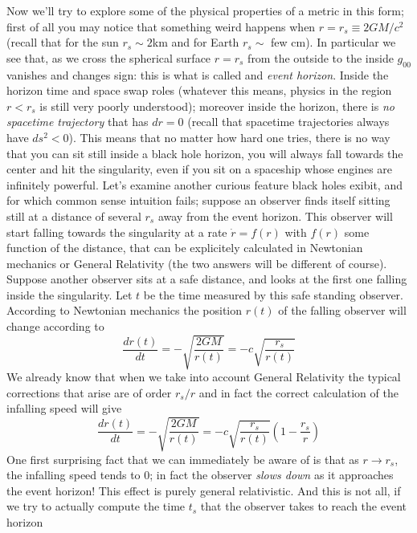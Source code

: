 \documentclass[11pt, a4paper,oneside,openright]{book}
\numberwithin{equation}{section}
\begin{document}
Now we'll try to explore some of the physical properties of a metric in this form; first of all you may notice that something weird happens when $r=r_s\equiv 2GM/c^2$ (recall that for the sun $r_s\sim 2$km and for Earth $r_s\sim$ few cm). In particular we see that, as we cross the spherical surface $r=r_s$ from the outside to the inside $g_{00}$ vanishes and changes sign: this is what is called and \textit{event horizon}. Inside the horizon time and space swap roles (whatever this means, physics in the region $r<r_s$ is still very poorly understood); moreover inside the horizon, there is \textit{no spacetime trajectory} that has $dr=0$ (recall that spacetime trajectories always have $ds^2<0$). This means that no matter how hard one tries, there is no way that you can sit still inside a black hole horizon, you will always fall towards the center and hit the singularity, even if you sit on a spaceship whose engines are infinitely powerful. Let's examine another curious feature black holes exibit, and for which common sense intuition fails; suppose an observer finds itself sitting still at a distance of several $r_s$ away from the event horizon. This observer will start falling towards the singularity at a rate $\dot{r}=f(r)$ with $f(r)$ some function of the distance, that can be explicitely calculated in Newtonian mechanics or General Relativity (the two answers will be different of course). Suppose another observer sits at a safe distance, and looks at the first one falling inside the singularity. Let $t$ be the time measured by this safe standing observer. According to Newtonian mechanics the position $r(t)$ of the falling observer will change according to 
\begin{equation}
\frac{dr(t)}{dt}=-\sqrt{\frac{2GM}{r(t)}}=-c\sqrt{\frac{r_s}{r(t)}}
\end{equation}
We already know that when we take into account General Relativity the typical corrections that arise are of order $r_s/r$ and in fact the correct calculation of the infalling speed will give
\begin{equation}
\frac{dr(t)}{dt}=-\sqrt{\frac{2GM}{r(t)}}=-c\sqrt{\frac{r_s}{r(t)}}\left(1-\frac{r_s}{r}\right)
\end{equation}
One first surprising fact that we can immediately be aware of is that as $r\rightarrow r_s$, the infalling speed tends to 0; in fact the observer \textit{slows down} as it approaches the event horizon! This effect is purely general relativistic. And this is not all, if we try to actually compute the time $t_s$ that the observer takes to reach the event horizon
\end{document}
